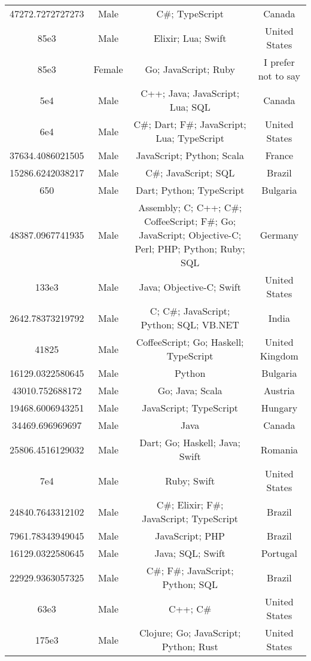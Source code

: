 \begin{center}
\begin{tabular}{ |c|c|c|c| }
47272.7272727273  &  Male  &  C\#; TypeScript  &  Canada  \\ 
85e3  &  Male  &  Elixir; Lua; Swift  &  United States  \\ 
85e3  &  Female  &  Go; JavaScript; Ruby  &  I prefer not to say  \\ 
5e4  &  Male  &  C++; Java; JavaScript; Lua; SQL  &  Canada  \\ 
6e4  &  Male  &  C\#; Dart; F\#; JavaScript; Lua; TypeScript  &  United States  \\ 
37634.4086021505  &  Male  &  JavaScript; Python; Scala  &  France  \\ 
15286.6242038217  &  Male  &  C\#; JavaScript; SQL  &  Brazil  \\ 
650  &  Male  &  Dart; Python; TypeScript  &  Bulgaria  \\ 
48387.0967741935  &  Male  &  Assembly; C; C++; C\#; CoffeeScript; F\#; Go; JavaScript; Objective-C; Perl; PHP; Python; Ruby; SQL  &  Germany  \\ 
133e3  &  Male  &  Java; Objective-C; Swift  &  United States  \\ 
2642.78373219792  &  Male  &  C; C\#; JavaScript; Python; SQL; VB.NET  &  India  \\ 
41825  &  Male  &  CoffeeScript; Go; Haskell; TypeScript  &  United Kingdom  \\ 
16129.0322580645  &  Male  &  Python  &  Bulgaria  \\ 
43010.752688172  &  Male  &  Go; Java; Scala  &  Austria  \\ 
19468.6006943251  &  Male  &  JavaScript; TypeScript  &  Hungary  \\ 
34469.696969697  &  Male  &  Java  &  Canada  \\ 
25806.4516129032  &  Male  &  Dart; Go; Haskell; Java; Swift  &  Romania  \\ 
7e4  &  Male  &  Ruby; Swift  &  United States  \\ 
24840.7643312102  &  Male  &  C\#; Elixir; F\#; JavaScript; TypeScript  &  Brazil  \\ 
7961.78343949045  &  Male  &  JavaScript; PHP  &  Brazil  \\ 
16129.0322580645  &  Male  &  Java; SQL; Swift  &  Portugal  \\ 
22929.9363057325  &  Male  &  C\#; F\#; JavaScript; Python; SQL  &  Brazil  \\ 
63e3  &  Male  &  C++; C\#  &  United States  \\ 
175e3  &  Male  &  Clojure; Go; JavaScript; Python; Rust  &  United States  \\ 

\end{tabular}
\end{center}
